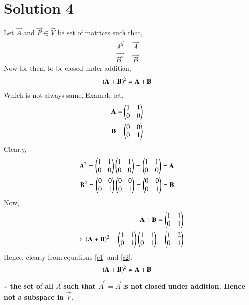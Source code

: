 \documentclass[journal,12pt,twocolumn]{IEEEtran}
\begin{document}
\section{Solution 4}
Let $\vec{A}$ and $\vec{B} \in \vec{V}$ be set of matrices such that,
\begin{align}
\vec{A^2}=\vec{A}\\
\vec{B^2}=\vec{B}
\end{align}
Now for them to be closed under addition,
\begin{align}
\left(\mathbf{A+B}\right)^2 = \mathbf{A+B}
\end{align} 
Which is not always same. Example let,
\begin{align}
\mathbf{A} = \begin{pmatrix}1&1\\0&0\end{pmatrix}\\
\mathbf{B} = \begin{pmatrix}0&0\\0&1\end{pmatrix}
\end{align}
Clearly,
\begin{align}
\mathbf{A}^2 = \begin{pmatrix}1&1\\0&0\end{pmatrix}\begin{pmatrix}1&1\\0&0\end{pmatrix} = \begin{pmatrix}1&1\\0&0\end{pmatrix} = \mathbf{A}\\
\mathbf{B}^2 =\begin{pmatrix}0&0\\0&1\end{pmatrix}\begin{pmatrix}0&0\\0&1\end{pmatrix} = \begin{pmatrix}0&0\\0&1\end{pmatrix} = \mathbf{B}
\end{align}
Now, 
\begin{align}
\mathbf{A+B} = \begin{pmatrix}1&1\\0&1\end{pmatrix}\label{e1}\\
\implies \left(\mathbf{A+B}\right)^2 = \begin{pmatrix}1&1\\0&1\end{pmatrix}\begin{pmatrix}1&1\\0&1\end{pmatrix} = \begin{pmatrix}1&2\\0&1\end{pmatrix}\label{e2}
\end{align}
Hence, clearly from equations \eqref{e1} and \eqref{e2},
\begin{align}
\left(\mathbf{A+B}\right)^2 \neq \mathbf{A+B}
\end{align}
\textbf{$\therefore$ the set of all $\vec{A}$ such that $\vec{A}^2=\vec{A}$ is not closed under addition. Hence not a subspace in $\vec{V}$.}
\end{document}
